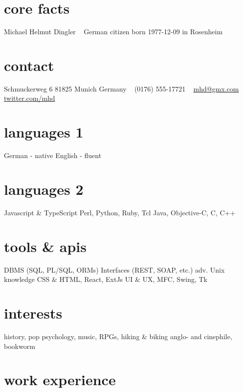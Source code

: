 \documentclass[]{friggeri-cv-a4}
\begin{document}


\begin{aside} %
\section{core facts}
Michael Helmut Dingler
~
German citizen
born 1977-12-09 in Rosenheim
\section{contact}
Schmuckerweg 6
81825 Munich
Germany
~
(0176) 555-17721
~
\href{mailto:mhd@gmx.com}{mhd@gmx.com}
\href{http://twitter.com/mhd}{twitter.com/mhd}
\section{languages 1}
German - native
English - fluent
\section{languages 2}
Javascript \& TypeScript
Perl, Python, Ruby, Tcl
Java, Objective-C, C, C++
\section{tools \& apis}
DBMS (SQL, PL/SQL, ORMs)
Interfaces (REST, SOAP, etc.)
adv. Unix knowledge
CSS \& HTML, React, ExtJs
UI \& UX, MFC, Swing, Tk
\section{interests}
history, pop psychology,
music, RPGs,
hiking \& biking
anglo- and cinephile,
bookworm
\end{aside}


\section{work experience}

\end{document}
